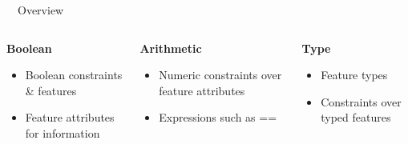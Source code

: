 \documentclass[
	aspectratio=169, %
	8pt, %
	nosectionframes, %
]{beamer}
\newcommand{\inlinesubtitle}[1]{\textcolor{gray!60}{~{}~#1}}
\begin{document}
\begin{frame}{\insertsection \inlinesubtitle{Overview}}
	\begin{columns}[t]
		\begin{column}{0.3\textwidth}
            \textbf{Boolean}
			\begin{itemize}
                    \item Boolean constraints \& features
                    \item Feature attributes for information
			\end{itemize}
		\end{column}
  		\begin{column}{0.3\textwidth}
            \textbf{Arithmetic}
			\begin{itemize}
                    \item Numeric constraints over feature attributes
                    \item Expressions such as ==
			\end{itemize}
		\end{column}
  		\begin{column}{0.3\textwidth}
            \textbf{Type}
			\begin{itemize}
                    \item Feature types
                    \item Constraints over typed features
			\end{itemize}
		\end{column}
	\end{columns}
\end{frame}
\end{document}
